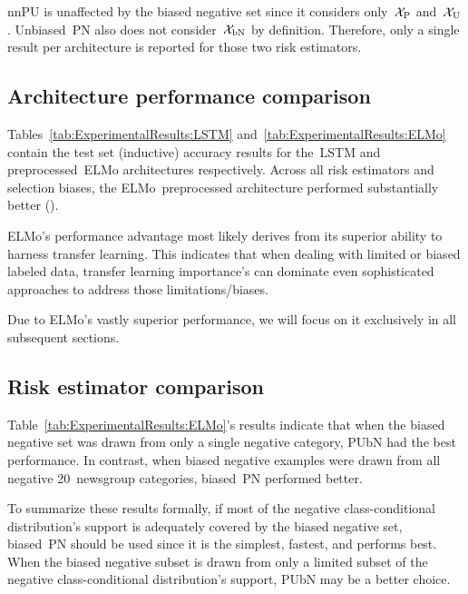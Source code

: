 nnPU is unaffected by the biased negative set since it considers only~$\mathcal{X}_{\textnormal{P}}$ and~$\mathcal{X}_{\textnormal{U}}$.  Unbiased~PN also does not consider~$\mathcal{X}_{\textnormal{bN}}$ by definition.  Therefore, only a single result per architecture is reported for those two risk estimators.

\subsection{Architecture performance comparison}

Tables~\ref{tab:ExperimentalResults:LSTM} and~\ref{tab:ExperimentalResults:ELMo} contain the test set (inductive) accuracy results for the~LSTM and preprocessed~ELMo architectures respectively.  Across all risk estimators and selection biases, the ELMo~preprocessed architecture performed substantially better ().

ELMo's performance advantage most likely derives from its superior ability to harness transfer learning.  This indicates that when dealing with limited or biased labeled data, transfer learning importance's can dominate even sophisticated approaches to address those limitations/biases.

Due to ELMo's vastly superior performance, we will focus on it exclusively in all subsequent sections.

\subsection{Risk estimator comparison}

Table~\ref{tab:ExperimentalResults:ELMo}'s results indicate that when the biased negative set was drawn from only a single negative category, PUbN had the best performance.  In contrast, when biased negative examples were drawn from all negative 20~newsgroup categories, biased~PN performed better.

To summarize these results formally, if most of the negative class-conditional distribution's support is adequately covered by the biased negative set, biased~PN should be used since it is the simplest, fastest, and performs best.  When the biased negative subset is drawn from only a limited subset of the negative class-conditional distribution's support, PUbN may be a better choice.

